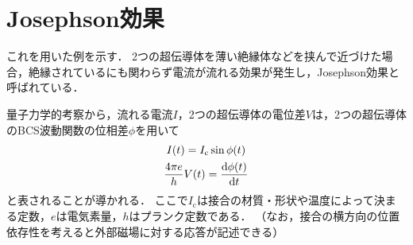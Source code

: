 \documentclass[dvipdfmx,autodetect-engine,12pt,fleqn]{jsarticle}
\begin{document}
\section{Josephson効果}
これを用いた例を示す．
2つの超伝導体を薄い絶縁体などを挟んで近づけた場合，絶縁されているにも関わらず電流が流れる効果が発生し，Josephson効果と呼ばれている．

量子力学的考察から，流れる電流$I$，2つの超伝導体の電位差$V$は，2つの超伝導体のBCS波動関数の位相差$\phi$を用いて
\begin{gather}
    I(t)=I_{\text{c}}\sin\phi(t)\\
    \frac{4\pi e}{h}V(t)=\dv{\phi(t)}{t}
\end{gather}
と表されることが導かれる．
ここで$I_{\text{c}}$は接合の材質・形状や温度によって決まる定数，$e$は電気素量，$h$はプランク定数である．
（なお，接合の横方向の位置依存性を考えると外部磁場に対する応答が記述できる）
\end{document}
